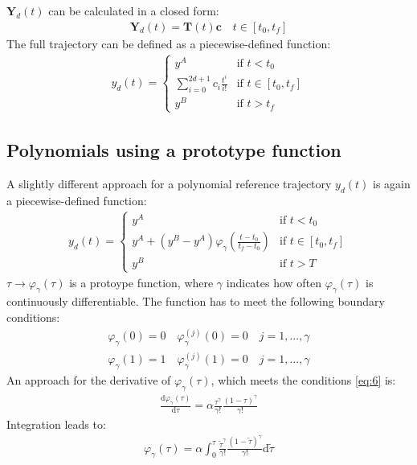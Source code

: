 \documentclass[a4paper,11pt,headings=standardclasses,parskip=half]{scrartcl}
\renewcommand{\d}{\mathrm{d}} %
\newcommand{\y}{\mathbf{y}}
\begin{document}
$\mathbf{Y}_d(t)$ can be calculated in a closed form:
\begin{align}
\label{eq:3}
\mathbf{Y}_d(t)=\mathbf{T}(t)\mathbf{c} \quad t \in [t_0,t_f] 
\end{align}
The full trajectory can be defined as a piecewise-defined function:
\begin{align}
y_d(t)=\begin{cases}y^A & \textrm{if } t<t_0 \\ \sum_{i=0}^{2d+1}c_i\frac{t^i}{i!} & \textrm{if } t\in [t_0,t_f] \\y^B & \textrm{if } t>t_f\end{cases}
\end{align}
\subsection{Polynomials using a prototype function}
A slightly different approach for a polynomial reference trajectory $y_d(t)$ is again a piecewise-defined function:
\begin{align}
\label{eq:5}
y_d(t) = \begin{cases} y^A &\textrm{if } t<t_0 \\ y^A + (y^B-y^A)\varphi_\gamma\left(\frac{t-t_0}{t_f-t_0}\right) &\textrm{if } t \in [t_0, t_f] \\y^B &\textrm{if } t>T\end{cases}
\end{align}
$\tau \rightarrow \varphi_\gamma(\tau)$ is a protoype function, where $\gamma$ indicates how often $\varphi_\gamma(\tau)$ is continuously differentiable. The function has to meet the following boundary conditions:
\begin{subequations}
\label{eq:6}
\begin{align}
\varphi_\gamma(0)=0 \quad \varphi^{(j)}_\gamma(0)=0 \quad j = 1,...,\gamma \\
\varphi_\gamma(1)=1 \quad \varphi^{(j)}_\gamma(1)=0 \quad j = 1,...,\gamma 
\end{align}
\end{subequations}
An approach for the derivative of $\varphi_\gamma(\tau)$, which meets the conditions \eqref{eq:6} is:
\begin{align}
\frac{\d \varphi_\gamma(\tau)}{\d \tau} = \alpha \frac{\tau^{\gamma}}{\gamma!}\frac{(1-\tau)^{\gamma}}{\gamma!}
\end{align}
Integration leads to:
\begin{align}
\varphi_\gamma(\tau) = \alpha \int_0^\tau\frac{\tilde{\tau}^{\gamma}}{\gamma!}\frac{(1-\tilde{\tau})^{\gamma}}{\gamma!} \d \tilde{\tau}
\end{align}
\end{document}
